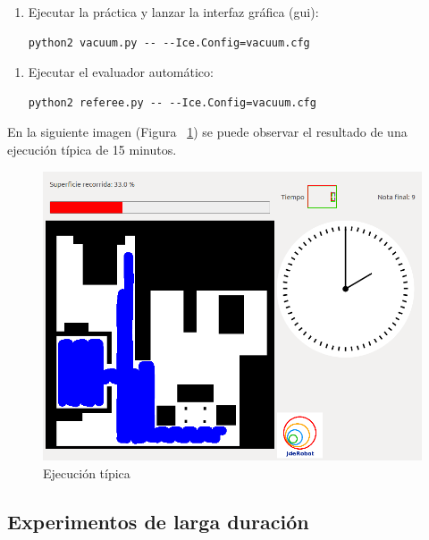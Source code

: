 \begin{enumerate}[2.]
\item	Ejecutar la práctica y lanzar la interfaz gráfica (\acrshort{gui}): 
	\begin{lstlisting}[frame=single]
		python2 vacuum.py -- --Ice.Config=vacuum.cfg
	\end{lstlisting} 
\end{enumerate}

\begin{enumerate}[3.]
\item	Ejecutar el evaluador automático: 
	\begin{lstlisting}[frame=single]
		python2 referee.py -- --Ice.Config=vacuum.cfg
  	\end{lstlisting} 
\end{enumerate}

En la siguiente imagen (Figura ~\ref{fig.ejTipica}) se puede observar el resultado de una ejecución típica de 15 minutos.

\begin{figure}[H]
  \begin{center}
    \includegraphics[width=1.0\textwidth]{figures/Vacuum/ejecucionTipicaRefereeSala.png}
		\caption{Ejecución típica}
		\label{fig.ejTipica}
		\end{center}
\end{figure}




\subsection{Experimentos de larga duración}

